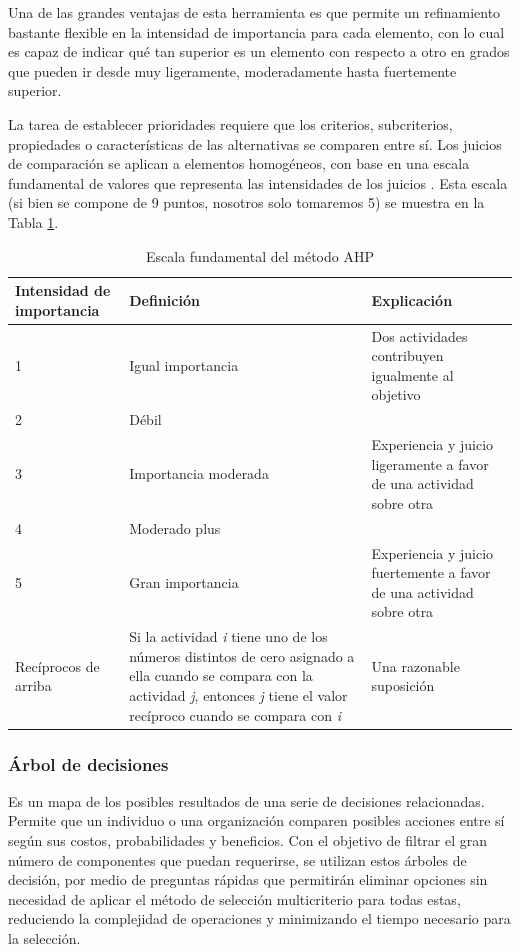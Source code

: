 Una de las grandes ventajas de esta herramienta es que permite un refinamiento bastante flexible en la intensidad de importancia para cada elemento, con lo cual es capaz de indicar qué tan superior es un elemento con respecto a otro en grados que pueden ir desde muy ligeramente, moderadamente hasta fuertemente superior.

La tarea de establecer prioridades requiere que los criterios, subcriterios, propiedades o características de las alternativas se comparen entre sí. Los juicios de comparación se aplican a elementos homogéneos, con base en una escala fundamental de valores que representa las intensidades de los juicios \cite{M18}. Esta escala (si bien se compone de 9 puntos, nosotros solo tomaremos 5) se muestra en la Tabla \ref{tabla:AHP}.

\begin{table}[H]
	\centering
	\caption{Escala fundamental del método AHP \cite{I9}}
	\begin{tabular}{@{}|p{2.5cm}|p{5cm}|p{5.5cm}|} 
		\hline
		\textbf{Intensidad de importancia} & \textbf{Definición} & \textbf{Explicación}  \\
		\hline \hline
		1 & Igual importancia & Dos actividades contribuyen igualmente al objetivo\\ \hline
		2 & Débil &  \\ \hline
		3 & Importancia moderada & Experiencia y juicio ligeramente a favor de una actividad sobre otra\\ \hline
		4 & Moderado plus &  \\ \hline
		5 & Gran importancia & Experiencia y juicio fuertemente a favor de una actividad sobre otra\\ \hline
		Recíprocos de arriba & Si la actividad \textit{i} tiene uno de los números distintos de cero asignado a ella cuando se compara con la actividad \textit{j}, entonces \textit{j} tiene el valor recíproco cuando se compara con \textit{i} & Una razonable suposición\\ \hline
		
	\end{tabular}	
	\label{tabla:AHP}
\end{table}

\subsubsection{Árbol de decisiones}
Es un mapa de los posibles resultados de una serie de decisiones relacionadas. Permite que un individuo o una organización comparen posibles acciones entre sí según sus costos, probabilidades y beneficios. Con el objetivo de filtrar el gran número de componentes que puedan requerirse, se utilizan estos árboles de decisión, por medio de preguntas rápidas que permitirán eliminar opciones sin necesidad de aplicar el método de selección multicriterio para todas estas, reduciendo la complejidad de operaciones y minimizando el tiempo necesario para la selección.

